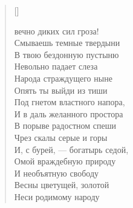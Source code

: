 \settowidth{\versewidth}{\vinТы вечно диких сил гроза!}
\begin{verse}[\versewidth]
\begin{patverse*}
 вечно диких сил гроза!\\
Смываешь темные твердыни\ldotst\\
В твою бездонную пустыню\\
Невольно падает слеза\\
Народа страждущего ныне\ldotst\\
Опять ты выйди из тиши\\
Под гнетом властного напора,\\
И в даль желанного простора\\
В порыве радостном спеши\\
Чрез скалы серые и горы\ldotst\\
И, с бурей, --- богатырь седой,\\
Омой враждебную природу\ldotst\\
И необъятную свободу\\
Весны цветущей, золотой\\
Неси родимому народу\ldotst
\end{patverse*}
\end{verse}

\newpage
\vspace*{-2cm}


